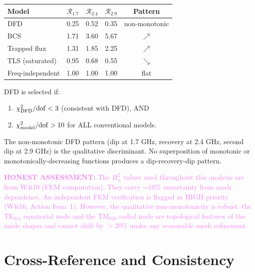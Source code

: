 \documentclass[11pt]{article}
\newcommand{\Heff}{H_n}
\newcommand{\honest}[1]{\textcolor{violet}{\textbf{HONEST ASSESSMENT:} #1}}
\theoremstyle{definition}
\theoremstyle{remark}
\begin{document}
\begin{center}
\renewcommand{\arraystretch}{1.15}
\begin{tabular}{@{}lcccc@{}}
\toprule
Model & $\mathcal{R}_{1.7}$ & $\mathcal{R}_{2.4}$
& $\mathcal{R}_{2.9}$ & Pattern \\
\midrule
DFD & 0.25 & 0.52 & 0.35 & non-monotonic \\
BCS & 1.71 & 3.60 & 5.67 & $\nearrow$ \\
Trapped flux & 1.31 & 1.85 & 2.25 & $\nearrow$ \\
TLS (saturated) & 0.95 & 0.68 & 0.55 & $\searrow$ \\
Freq-independent & 1.00 & 1.00 & 1.00 & flat \\
\bottomrule
\end{tabular}
\end{center}

DFD is selected if:
\begin{enumerate}[nosep]
\item $\chi^2_{\rm DFD}/{\rm dof} < 3$ (consistent with DFD), AND
\item $\chi^2_{\rm model}/{\rm dof} > 10$ for ALL conventional models.
\end{enumerate}

The non-monotonic DFD pattern (dip at 1.7 GHz, recovery at 2.4 GHz,
second dip at 2.9 GHz) is the qualitative discriminant. No
superposition of monotonic or monotonically-decreasing functions
produces a dip-recovery-dip pattern.

\honest{The $\Heff^2$ values used throughout this analysis are from
W4i10 (FEM computation). They carry $\sim 10\%$ uncertainty from
mesh dependence. An independent FEM verification is flagged as
HIGH priority (W4i16, Action Item~1). However, the qualitative
non-monotonicity is robust: the TE$_{011}$ equatorial node and
the TM$_{020}$ radial node are topological features of the mode
shapes and cannot shift by $> 20\%$ under any reasonable mesh
refinement.}


\part{Cross-Reference and Consistency}
\label{sec:crossref}
\end{document}
